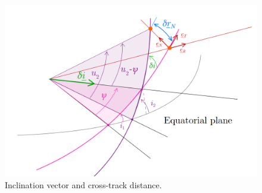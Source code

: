 			\begin{figure}[!htb]
			\centering\includegraphics[width = 0.6\linewidth]{Chapters/Chapter_02/inc_effect}
			\caption{Inclination vector and cross-track distance.}
			\label{figCh2:inc_effect}
			\end{figure}
			\FloatBarrier
